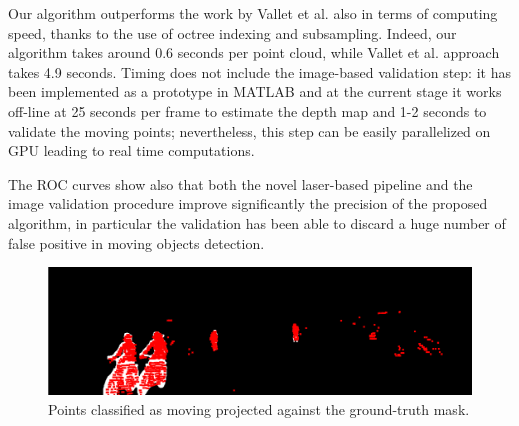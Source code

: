 Our algorithm outperforms the work by Vallet et al. also in terms of computing speed, thanks to the use of octree indexing and subsampling. 
Indeed, our algorithm takes around 0.6 seconds per point cloud, while Vallet et al. approach takes 4.9 seconds.
Timing does not include the image-based validation step: it has been implemented as a prototype in MATLAB and at the current stage it works off-line at 25 seconds per frame to estimate the depth map and 1-2 seconds to validate the moving points; nevertheless, this step can be easily parallelized on GPU leading to real time computations.

The ROC curves show also that both the novel laser-based pipeline and the image validation procedure improve significantly the precision of the proposed algorithm, in particular the validation has been able to discard a huge number of false positive in moving objects detection.


\begin{figure}[t]
\centering
\includegraphics[width=0.98\columnwidth]{./img/ch-laser/points_result_on_mask}
\caption{Points classified as moving projected against the ground-truth mask.} 
\label{fig:points}
\end{figure}




